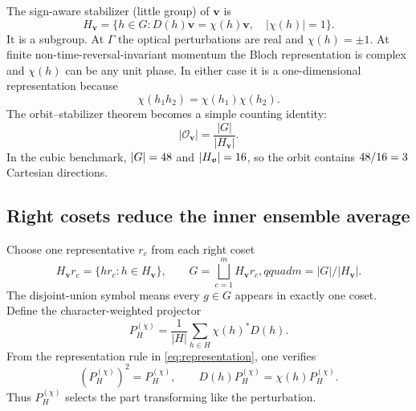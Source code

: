 \documentclass[11pt,a4paper]{article}
\begin{document}
The sign-aware stabilizer (little group) of $\bm v$ is
\begin{equation}
  H_{\bm v}=\{h\in G:D(h)\bm v=\chi(h)\bm v,\quad
  |\chi(h)|=1\}.
  \label{eq:stabilizer}
\end{equation}
It is a subgroup.  At $\Gamma$ the optical perturbations are real and
$\chi(h)=\pm1$.  At finite non-time-reversal-invariant momentum the Bloch
representation is complex and $\chi(h)$ can be any unit phase.  In either
case it is a one-dimensional representation because
\begin{equation}
  \chi(h_1h_2)=\chi(h_1)\chi(h_2).
\end{equation}
The orbit--stabilizer theorem becomes a simple counting identity:
\begin{equation}
  |\mathcal O_{\bm v}|=\frac{|G|}{|H_{\bm v}|}.
  \label{eq:orbit-stabilizer}
\end{equation}
In the cubic benchmark, $|G|=48$ and
$|H_{\bm v}|=16$, so the orbit contains
$48/16=3$ Cartesian directions.

\subsection{Right cosets reduce the inner ensemble average}

Choose one representative $r_c$ from each right coset
\begin{equation}
  H_{\bm v}r_c=\{hr_c:h\in H_{\bm v}\},\qquad
  G=\bigsqcup_{c=1}^{m}H_{\bm v}r_c,qquad
  m=|G|/|H_{\bm v}|.
  \label{eq:right-cosets}
\end{equation}
The disjoint-union symbol means every $g\in G$ appears in exactly one coset.
Define the character-weighted projector
\begin{equation}
  P_H^{(\chi)}=\frac1{|H|}\sum_{h\in H}\chi(h)^*D(h).
  \label{eq:projector}
\end{equation}
From the representation rule in \cref{eq:representation}, one verifies
\begin{equation}
  \left(P_H^{(\chi)}\right)^2=P_H^{(\chi)},\qquad
  D(h)P_H^{(\chi)}=\chi(h)P_H^{(\chi)}.
\end{equation}
Thus $P_H^{(\chi)}$ selects the part transforming like the perturbation.
\end{document}
